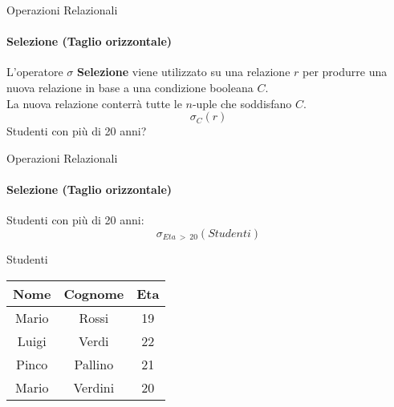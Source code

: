     \begin{frame}{Operazioni Relazionali}
        \framesubtitle{Selezione (Taglio orizzontale)}
        L'operatore $\sigma$ \textbf{Selezione} viene utilizzato su una relazione $r$ per produrre una nuova relazione in base a una condizione booleana $C$.
        \\La nuova relazione conterr\`a tutte le $n$-uple che soddisfano $C$.
        \[\sigma_C (r)\]
        \vspace*{0.2cm}
         \centering Studenti con pi\`u di 20 anni?
    \end{frame}
    \begin{frame}{Operazioni Relazionali}
        \framesubtitle{Selezione (Taglio orizzontale)}
        Studenti con pi\`u di 20 anni:
        \[\sigma_{Eta~>~20} (Studenti)\]
                    \begin{center}
                        {\small Studenti}
                        
                        \begin{tabular}{|c|c|c|}
                            \hline
                            \rowcolor{cyan!30}Nome & Cognome & Eta \\
                            \hline
                            Mario & Rossi & 19 \\ \hline
                            \rowcolor{red}Luigi & Verdi & 22 \\ \hline
                            \rowcolor{red}Pinco & Pallino & 21 \\ \hline
                            Mario & Verdini & 20 \\ \hline
                            \end{tabular}
                    
                    \end{center}
    \end{frame}
